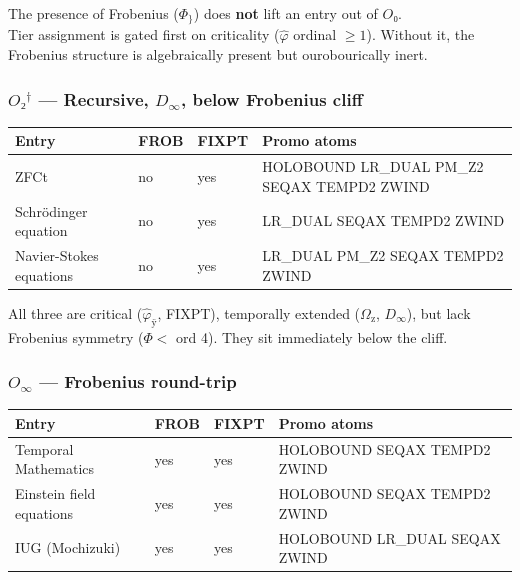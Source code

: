 \documentclass[12pt,a4paper]{article}
\begin{document}
The presence of Frobenius ($\Phi_{\}}$) does \textbf{not} lift an entry out of $O₀$. \\
Tier assignment is gated first on criticality ($\hat{\varphi}$ ordinal $\geq 1$). Without it, the Frobenius structure is algebraically present but ourobourically inert.

\subsubsection*{$O₂^\dagger$ --- Recursive, $D_\infty$, below Frobenius cliff}

\begin{table}[htbp]
\centering
\small

\begin{tabularx}{\textwidth}{>{\raggedright\arraybackslash}X >{\centering\arraybackslash}X >{\centering\arraybackslash}X >{\raggedright\arraybackslash}X}
\toprule
\textbf{Entry} & \textbf{FROB} & \textbf{FIXPT} & \textbf{Promo atoms} \\
\midrule

ZFCt & no & yes & HOLOBOUND LR\_DUAL PM\_Z2 SEQAX TEMPD2 ZWIND \\
Schrödinger equation & no & yes & LR\_DUAL SEQAX TEMPD2 ZWIND \\
Navier-Stokes equations & no & yes & LR\_DUAL PM\_Z2 SEQAX TEMPD2 ZWIND \\
\bottomrule
\end{tabularx}
\end{table}

All three are critical ($\hat{\varphi}_{\text{ÿ}}$, FIXPT), temporally extended ($\Omega_{\text{z}}$, $D_\infty$), but lack Frobenius symmetry ($\Phi <$ ord 4). They sit immediately below the cliff.

\subsubsection*{$O_\infty$ --- Frobenius round-trip}

\begin{table}[htbp]
\centering
\small

\begin{tabularx}{\textwidth}{>{\raggedright\arraybackslash}X >{\centering\arraybackslash}X >{\centering\arraybackslash}X >{\raggedright\arraybackslash}X}
\toprule
\textbf{Entry} & \textbf{FROB} & \textbf{FIXPT} & \textbf{Promo atoms} \\
\midrule

Temporal Mathematics & yes & yes & HOLOBOUND SEQAX TEMPD2 ZWIND \\
Einstein field equations & yes & yes & HOLOBOUND SEQAX TEMPD2 ZWIND \\
IUG (Mochizuki) & yes & yes & HOLOBOUND LR\_DUAL SEQAX ZWIND \\
\bottomrule
\end{tabularx}
\end{table}
\end{document}
